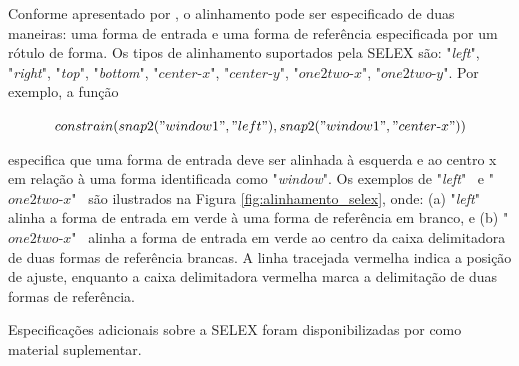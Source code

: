 Conforme apresentado por , o alinhamento pode ser especificado de duas maneiras: uma forma de entrada e uma forma de referência especificada por um rótulo de forma. Os tipos de alinhamento suportados pela \gls{SELEX} são: "\textit{left}", "\textit{right}", "\textit{top}", "\textit{bottom}", "$center\mbox{-}x$", "$center\mbox{-}y$", "$one2two\mbox{-}x$", "$one2two\mbox{-}y$". Por exemplo, a função 

\vspace{0.5cm}

\begin{description}
    \item[] \qquad \qquad $constrain(snap2("window1", "left"), snap2("window1", "center\mbox{-}x"))$
\end{description}

\vspace{0.5cm}

\noindent especifica que uma forma de entrada deve ser alinhada à esquerda e ao centro x em relação à uma forma identificada como "\textit{window}". Os exemplos de "\textit{left}" \, e "$one2two\mbox{-}x$" \, são ilustrados na Figura \ref{fig:alinhamento_selex}, onde: (a) "\textit{left}" \, alinha a forma de entrada em verde à uma forma de referência em branco, e (b) "$one2two\mbox{-}x$" \, alinha a forma de entrada em verde ao centro da caixa delimitadora de duas formas de referência brancas. A linha tracejada vermelha indica a posição de ajuste, enquanto a caixa delimitadora vermelha marca a delimitação de duas formas de referência.

\begin{figure}[h!]
	\centering
	\captionsetup{width=15cm}
	{}	
\end{figure}

Especificações adicionais sobre a \gls{SELEX} foram disponibilizadas por  como material suplementar.

